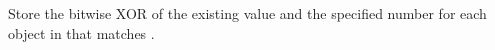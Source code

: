 Store the bitwise XOR of the existing value and the specified number for each
object in  that matches .


